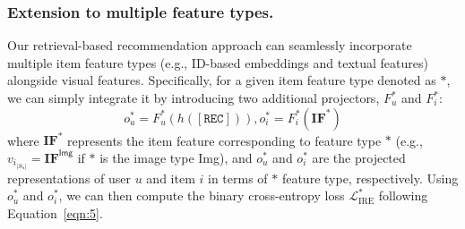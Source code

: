 \documentclass[sigconf]{acmart}
\newcommand{\rectoken}{$\left[ \texttt{REC} \right]$}
\begin{document}
\subsubsection{\textbf{Extension to multiple feature types. }} 
Our retrieval-based recommendation approach can seamlessly incorporate multiple item feature types (e.g., ID-based embeddings and textual features) alongside visual features. Specifically, for a given item feature type denoted as $*$, we can simply integrate it by introducing two additional projectors, $F^*_{u}$ and $F^*_i$:
\begin{equation}
    o_u^*=F^{*}_u(h(\left[ \texttt{REC} \right])), o_i^*=F^{*}_i(\mathbf{IF}^{*})
\end{equation}
\noindent where $\mathbf{IF}^*$  represents the item feature corresponding to feature type $*$ (e.g., $v_{i_{|S_u|}}=\mathbf{IF}^{\textsf{Img}}$ if $*$ is the image type \textsf{Img}), and
$o_u^*$ and $o_i^*$ are the projected representations of user $u$ and item $i$ in terms of $*$ feature type, respectively. Using $o_u^*$ and $o_i^*$, we can then compute the binary cross-entropy loss $\mathcal{L}_{\text{IRE}}^*$ following Equation~\ref{eqn:5}.  

\end{document}
